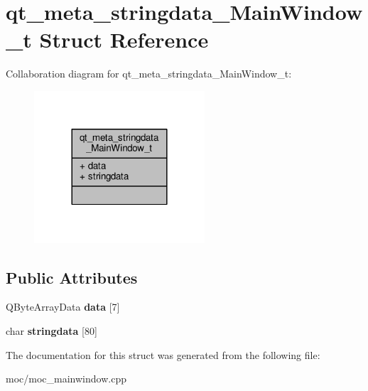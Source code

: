 \hypertarget{structqt__meta__stringdata___main_window__t}{\section{qt\-\_\-meta\-\_\-stringdata\-\_\-\-Main\-Window\-\_\-t Struct Reference}
\label{structqt__meta__stringdata___main_window__t}
}


Collaboration diagram for qt\-\_\-meta\-\_\-stringdata\-\_\-\-Main\-Window\-\_\-t\-:
\nopagebreak
\begin{figure}[H]
\begin{center}
\leavevmode
\includegraphics[width=180pt]{structqt__meta__stringdata___main_window__t__coll__graph}
\end{center}
\end{figure}
\subsection*{Public Attributes}
\begin{DoxyCompactItemize}
\item 
\hypertarget{structqt__meta__stringdata___main_window__t_a70e55b3cae36e81c3bf1093c26a52b51}{Q\-Byte\-Array\-Data {\bfseries data} \mbox{[}7\mbox{]}}\label{structqt__meta__stringdata___main_window__t_a70e55b3cae36e81c3bf1093c26a52b51}

\item 
\hypertarget{structqt__meta__stringdata___main_window__t_a271ece9be412756639f48edfea3470b8}{char {\bfseries stringdata} \mbox{[}80\mbox{]}}\label{structqt__meta__stringdata___main_window__t_a271ece9be412756639f48edfea3470b8}

\end{DoxyCompactItemize}


The documentation for this struct was generated from the following file\-:\begin{DoxyCompactItemize}
\item 
moc/moc\-\_\-mainwindow.\-cpp\end{DoxyCompactItemize}

